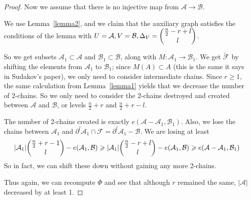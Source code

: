 \documentclass[12pt]{article}
\theoremstyle{plain}
\theoremstyle{definition}
\theoremstyle{remark}
\newcommand{\F}{\mathcal{F}}
\newcommand{\A}{\mathcal{A}}
\newcommand{\B}{\mathcal{B}}
\begin{document}
\begin{proof}

Now we assume that there is no injective map from $\A \rightarrow \B$.

We use Lemma~\ref{lemma2}, and we claim that the auxiliary graph satisfies the conditions of the lemma with $U = \A, V = \B, \Delta_V = \dbinom{\frac{n}{2} - r + l}{l}$.

So we get subsets $\A_1 \subset \A$ and $\B_1 \subset \B$, along with $M:\A_1 \rightarrow \B_1$. We get $\tilde{\F}$ by shifting the elements from $\A_1$ to $\B_1$; since $M(A) \subset A$ (this is the same it says in Sudakov's paper), we only need to consider intermediate chains. Since $r \geq 1$, the same calculation from Lemma~\ref{lemma1} yields that we decrease the number of 2-chains. So we only need to consider the 2-chains destroyed and created between $\A$ and $\B$, or levels $\frac{n}{2} + r$ and $\frac{n}{2} + r - l$.

The number of 2-chains created is exactly $e(\A - \A_1, \B_1)$. Also, we lose the chains between $\A_1$ and $\partial^l\A_1 \cap \F = \partial^l\A_1 - \B$. We are losing at least
\[ |\A_1|\dbinom{\frac{n}{2}+r-1}{l} - e(\A_1, \B) \geq |\A_1|\dbinom{\frac{n}{2} - r + l}{l} - e(\A_1, \B) \geq e(\A - \A_1, \B_1) \] 
So in fact, we can shift these down without gaining any more 2-chains.

Thus again, we can recompute $\Phi$ and see that although $r$ remained the same, $|\A|$ decreased by at least 1. 
\end{proof}
\end{document}
